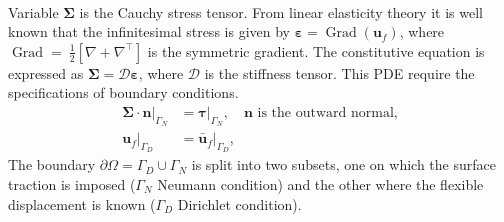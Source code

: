 \documentclass{svjour3}                     %
\DeclareMathOperator*{\Grad}{Grad}
\begin{document}
\begin{itemize}
\begin{equation}
\begin{split}
		\end{split}
	\end{equation}
	Variable $\bm\Sigma$ is the Cauchy stress tensor. From linear elasticity theory it is well known that the infinitesimal stress is given by $\bm\varepsilon = \Grad(\bm{u}_f)$, where $\Grad=~\frac{1}{2}[\nabla+\nabla^\top]$ is the symmetric gradient. The constitutive equation is expressed as $\bm\Sigma =  \bm{\mathcal{D}} \bm\varepsilon$, where $ \bm{\mathcal{D}}$ is the stiffness tensor. This PDE require the specifications of boundary conditions.
	\begin{equation}
	\label{eq:bcPDE}
	\begin{aligned}
	\bm\Sigma \cdot \bm{n}|_{\Gamma_N} &= \bm\tau|_{\Gamma_N}, \quad \text{$\bm{n}$ is the outward normal,} \\
	\bm{u}_f|_{\Gamma_D} &= \bm{\bar{u}}_f|_{\Gamma_D},
	\end{aligned}
	\end{equation}
	The boundary $\partial \Omega = \Gamma_D \cup \Gamma_N$ is split into two subsets, one on which the surface traction is imposed ($\Gamma_N$ Neumann condition) and the other where the flexible displacement is known ($\Gamma_D$ Dirichlet condition). 
\end{itemize}
\end{document}
